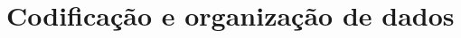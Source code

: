 \documentclass{beamer}\usepackage[]{graphicx}\usepackage[]{color}
\begin{document}
\section{Codificação e organização de dados}
% 
% 
% 
% 
% 
% 
%  
% 
% 
% 
% 
\end{document}
